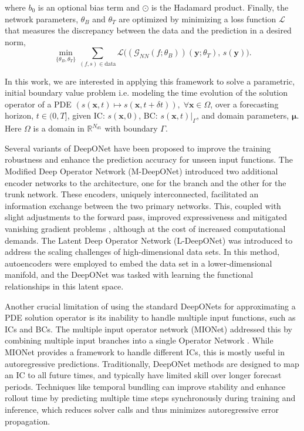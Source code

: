 \documentclass[draft]{agujournal2019}
\begin{document}
 where $b_0$ is an optional bias term and $\odot$ is the Hadamard product. Finally, the network parameters, $\theta_B$ and $\theta_T$ are optimized by minimizing a loss function $\mathcal{L}$ that measures the discrepancy between the data and the prediction in a desired norm,
\begin{equation}
\min_{\{\theta_B, \theta_T\}} \sum_{(f,s) \in \text{data}} \mathcal{L}\Big((\mathcal{G}_{NN}(f;\theta_B))(\mathbf{y};\theta_T), \, s(\mathbf{y}) \Big).
\label{eq:operator_loss}
\end{equation}

In this work, we are interested in applying this framework to solve a parametric, initial boundary value problem i.e. modeling the time evolution of the solution operator of a PDE $(s(\mathbf{x},t) \mapsto s(\mathbf{x},t+\delta t)),\; \forall \mathbf{x}\in \Omega$, over a forecasting horizon, $t \in (0,T]$, given IC: $s(\mathbf{x},0)$, BC: $s(\mathbf{x},t)\vert_{\Gamma}$, and domain parameters, $\boldsymbol\mu$. Here $\Omega$ is a domain in  $\mathbb{R}^{N_{d1}}$ with boundary $\Gamma$.


Several variants of DeepONet have been proposed to improve the training robustness and enhance the prediction accuracy for unseen input functions. The Modified Deep Operator Network (M-DeepONet) introduced two additional encoder networks to the architecture, one for the branch and the other for the trunk network. These encoders, uniquely interconnected, facilitated an information exchange between the two primary networks. This, coupled with slight adjustments to the forward pass, improved expressiveness and mitigated vanishing gradient problems \cite{wang2022improved}, although at the cost of increased computational demands. The Latent Deep Operator Network (L-DeepONet) was introduced \cite{kontolati2023learning} to address the scaling challenges of high-dimensional data sets. In this method, autoencoders were employed to embed the data set in a lower-dimensional manifold, and the DeepONet was tasked with learning the functional relationships in this latent space. 

Another crucial limitation of using the standard DeepONets for approximating a PDE solution operator is its inability to handle multiple input functions, such as ICs and BCs. The multiple input operator network (MIONet) addressed this by combining multiple input branches into a single Operator Network \cite{jin2022mionet}. While MIONet provides a framework to handle different ICs, this is mostly useful in autoregressive predictions. Traditionally, DeepONet methods are designed to map an IC to all future times, and typically have limited skill over longer forecast periods. Techniques like temporal bundling can improve stability and enhance rollout time \cite{brandstetter2022message, ovadia2023ditto} by predicting multiple time steps synchronously during training and inference, which reduces solver calls and thus minimizes autoregressive error propagation. 
\end{document}
